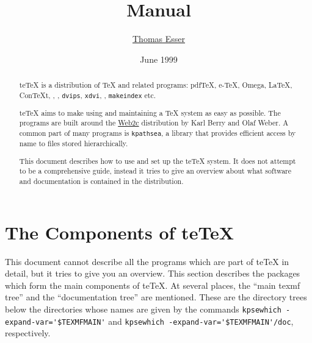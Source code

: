 \documentclass[11pt,a4paper]{article}
\title{\teTeX{} Manual}
\author{\href{mailto:te@informatik.uni-hannover.de}{Thomas Esser}}
\date{June 1999}
\newcommand{\teTeX}{\textrm{te}\TeX\xspace}
\begin{document}
\maketitle

\begin{abstract}
  
  \teTeX{} is a distribution of \TeX{} and related programs: pdf\TeX,
  e-\TeX, Omega, \LaTeX, Con\TeX{}t, \MF, \MP{}, \texttt{dvips},
  \texttt{xdvi}, \BibTeX{}, \texttt{makeindex} etc.
  
  \teTeX{} aims to make using and maintaining a \TeX{} system as easy
  as possible. The programs are built around the
  \href{ftp://ftp.cs.umb.edu/tex}{Web2c} distribution by Karl Berry
  and Olaf Weber. A common part of many programs is \texttt{kpathsea},
  a library that provides efficient access by name to files stored
  hierarchically.
  
  This document describes how to use and set up the \teTeX{} system.
  It does not attempt to be a comprehensive guide, instead it tries to
  give an overview about what software and documentation is contained
  in the distribution.
\end{abstract}

\newpage
\tableofcontents

\newpage

\section{The Components of \teTeX}

This document cannot describe all the programs which are part of
\teTeX{} in detail, but it tries to give you an overview. This section
describes the packages which form the main components of \teTeX{}. At
several places, the ``main texmf tree'' and the ``documentation tree''
are mentioned. These are the directory trees below the directories
whose names are given by the commands
\verb+kpsewhich -expand-var='$TEXMFMAIN'+ and
\verb+kpsewhich -expand-var='$TEXMFMAIN'/doc+, respectively.
\end{document}
